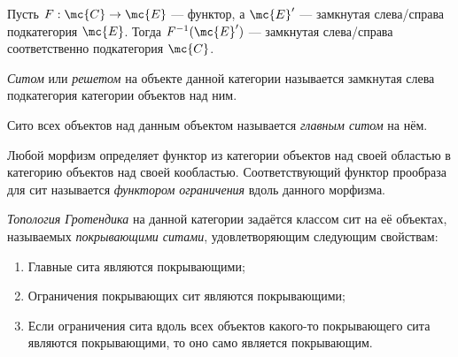\documentclass[
	extrafontsizes,
	11pt,
	hyphens,
]{memoir}
\begin{document}

\begin{observation}
Пусть \(F : \mc{C} \to \mc{E}\) --- функтор, а \(\mc{E}'\) --- замкнутая слева/справа подкатегория \(\mc{E}\).
Тогда \(F^{-1}(\mc{E}')\) --- замкнутая слева/справа соответственно подкатегория \(\mc{C}\).
\end{observation}

\begin{definition}
\emph{Ситом} или \emph{решетом} на объекте данной категории называется замкнутая слева подкатегория категории объектов над ним.
\end{definition}

\begin{definition}
Сито всех объектов над данным объектом называется \emph{главным ситом} на нём.
\end{definition}


\begin{definition}
Любой морфизм определяет функтор из категории объектов над своей областью в категорию объектов над своей кообластью. Соответствующий функтор прообраза для сит называется \emph{функтором ограничения} вдоль данного морфизма.
\end{definition}


\begin{definition}
\emph{Топология Гротендика} на данной категории задаётся классом сит на её объектах, называемых \emph{покрывающими ситами}, удовлетворяющим следующим свойствам:
\begin{enumerate}[
	font=\upshape,
	label=\asbuk*),
	ref=\asbuk*,
	]

\item Главные сита являются покрывающими;

\item Ограничения покрывающих сит являются покрывающими;

\item Если ограничения сита вдоль всех объектов какого-то покрывающего сита являются покрывающими, то оно само является покрывающим.

\end{enumerate}
\end{definition}
\end{document}
